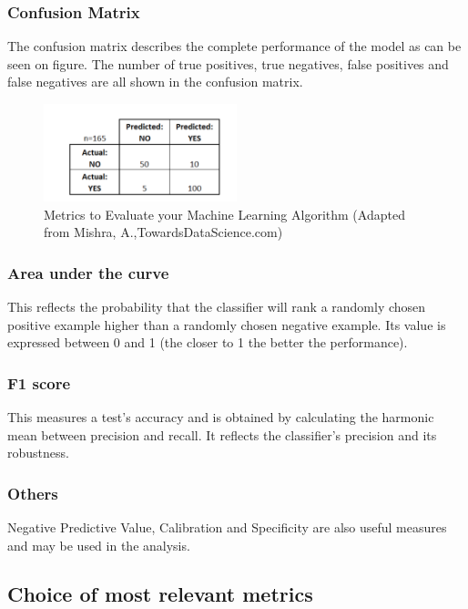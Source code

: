 \subsubsection{Confusion Matrix}

The confusion matrix describes the complete performance of the model as can be seen on figure. The number of true positives, true negatives, false positives and false negatives are all shown in the confusion matrix.

\begin{figure}[H]
    \centering
    \includegraphics[width=0.5\textwidth]{ThesisTemplate/usingLatex/images/ConfusionMatrix.png}
    \caption{Metrics to Evaluate your Machine Learning Algorithm (Adapted from Mishra, A.,TowardsDataScience.com)}
    \label{fig:metrics}
\end{figure}

\subsubsection{Area under the curve}
This reflects the probability that the classifier will rank a randomly chosen positive example higher than a randomly chosen negative example. Its value is expressed between 0 and 1 (the closer to 1 the better the performance).


\subsubsection{F1 score}
This measures a test's accuracy and is obtained by calculating the harmonic mean between precision and recall. It reflects the classifier's precision and its robustness.

\subsubsection{Others}
Negative Predictive Value, Calibration and Specificity are also useful measures and may be used in the analysis.

\subsection{Choice of most relevant metrics}
